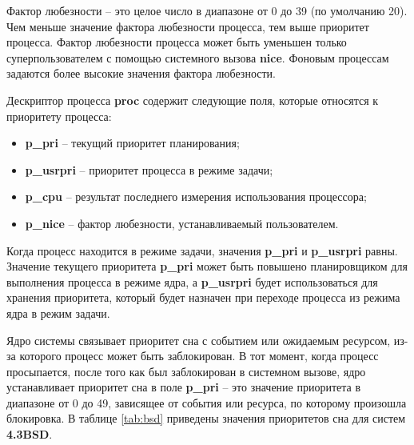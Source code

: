 \documentclass[a4paper,12pt]{extreport}
\begin{document}
Фактор любезности -- это целое число в диапазоне от 0 до 39 (по умолчанию 20). Чем меньше значение фактора любезности процесса, тем выше приоритет процесса. Фактор любезности процесса может быть уменьшен только суперпользователем с помощью системного вызова \textbf{nice}. Фоновым процессам задаются более высокие значения фактора любезности.

Дескриптор процесса \textbf{proc} содержит следующие поля, которые относятся к приоритету процесса:

\begin{itemize}
	\item \textbf{p\_pri} -- текущий приоритет планирования;
	\item \textbf{p\_usrpri} -- приоритет процесса в режиме задачи;
	\item \textbf{p\_cpu} -- результат последнего измерения использования процессора;
	\item \textbf{p\_nice} -- фактор любезности, устанавливаемый пользователем.
\end{itemize}

Когда процесс находится в режиме задачи, значения \textbf{p\_pri} и \textbf{p\_usrpri} равны. Значение текущего приоритета \textbf{p\_pri} может быть повышено планировщиком для выполнения процесса в режиме ядра, а \textbf{p\_usrpri} будет использоваться для хранения приоритета, который будет назначен при переходе процесса из режима ядра в режим задачи.

Ядро системы связывает приоритет сна с событием или ожидаемым ресурсом, из-за которого процесс может быть заблокирован. В тот момент, когда процесс просыпается, после того как был заблокирован в системном вызове, ядро устанавливает приоритет сна в поле \textbf{p\_pri} -- это значение приоритета в диапазоне от 0 до 49, зависящее от события или ресурса, по которому произошла блокировка. В таблице \ref{tab:bsd} приведены значения приоритетов сна для систем \textbf{4.3BSD}.
\end{document}
